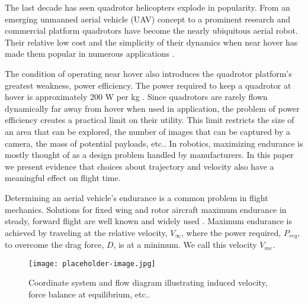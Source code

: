  
The last decade has seen quadrotor helicopters explode in popularity. From an emerging unmanned aerial vehicle (UAV) concept to a prominent research and commercial platform \cite{kumar2012opportunities,hoffmann2007quadrotor} quadrotors have become the nearly ubiquitous aerial robot. Their relative low cost and the simplicity of their dynamics when near hover \cite{bouabdallah2004pid} has made them popular in numerous applications \cite{heng2015efficient,roberts2017submodular,frazzoli2002real}.

The condition of operating near hover also introduces the quadrotor platform's greatest weakness, power efficiency. The power required to keep a quadrotor at hover is approximately 200 W per kg \cite{kumar2012opportunities}. Since quadrotors are rarely flown dynamically far away from hover when used in application, the problem of power efficiency creates a practical limit on their utility. This limit restricts the size of an area that can be explored, the number of images that can be captured by a camera, the mass of potential payloads, etc.. In robotics, maximizing endurance is mostly thought of as a design problem handled by manufacturers. In this paper we present evidence that choices about trajectory and velocity also have a meaningful effect on flight time.

Determining an aerial vehicle's endurance is a common problem in flight mechanics. Solutions for fixed wing and rotor aircraft maximum endurance in steady, forward flight are well known and widely used \cite{anderson2005introduction,leishman2006principles}. Maximum endurance is achieved by traveling at the relative velocity, $V_\infty$, where the power required, $P_{req}$, to overcome the drag force, $D$, is at a minimum. We call this velocity $V_{me}$. 


\begin{figure}[ht]
    \label{QuadDiagram}
	\centering
	\texttt{[image: placeholder-image.jpg]}
	\caption{Coordinate system and flow diagram illustrating induced velocity, force balance at equilibrium, etc..}
\end{figure}
